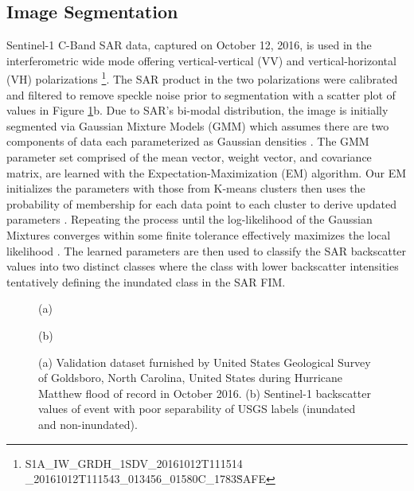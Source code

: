 \documentclass{article}
\begin{document}
\subsection{Image Segmentation}
\label{ssec:image_segmentation}
%
Sentinel-1 C-Band SAR data, captured on October 12, 2016, is used in the interferometric wide mode offering vertical-vertical (VV) and vertical-horizontal (VH) polarizations \cite{copernicus2016sentinel} \footnote{S1A\_IW\_GRDH\_1SDV\_20161012T111514 \_20161012T111543\_013456\_01580C\_1783\.SAFE}. 
The SAR product in the two polarizations were calibrated and filtered to remove speckle noise prior to segmentation \cite{zuhlke2015snap,yommy2015sar} with a scatter plot of values in Figure \ref{fig:validation_sar_labels}b. 
Due to SAR's bi-modal distribution, the image is initially segmented via Gaussian Mixture Models (GMM) which assumes there are two components of data each parameterized as Gaussian densities \cite{reynolds2009gaussian,mclachlan2004finite}.
The GMM parameter set comprised of the mean vector, weight vector, and covariance matrix, are learned with the Expectation-Maximization (EM) algorithm. 
Our EM initializes the parameters with those from K-means clusters then uses the probability of membership for each data point to each cluster to derive updated parameters \cite{barazandeh2018behavior,dempster1977maximum}. 
Repeating the process until the log-likelihood of the Gaussian Mixtures converges within some finite tolerance effectively maximizes the local likelihood \cite{barazandeh2018behavior,dempster1977maximum}.
The learned parameters are then used to classify the SAR backscatter values into two distinct classes where the class with lower backscatter intensities tentatively defining the inundated class in the SAR FIM.
% 
\begin{figure}[htb]
    \begin{minipage}[b]{.48\linewidth}
        \centering
        \centerline{}
        \centerline{(a)}\medskip
    \end{minipage}
    \hfill
    \begin{minipage}[b]{0.48\linewidth}
        \centering
        \centerline{}
        \centerline{(b)}\medskip
    \end{minipage}
    \caption{(a) Validation dataset furnished by United States Geological Survey of Goldsboro, North Carolina, United States during Hurricane Matthew flood of record in October 2016. (b) Sentinel-1 backscatter values of event with poor separability of USGS labels (inundated and non-inundated).}
    \label{fig:validation_sar_labels}
\end{figure}
%
\end{document}
